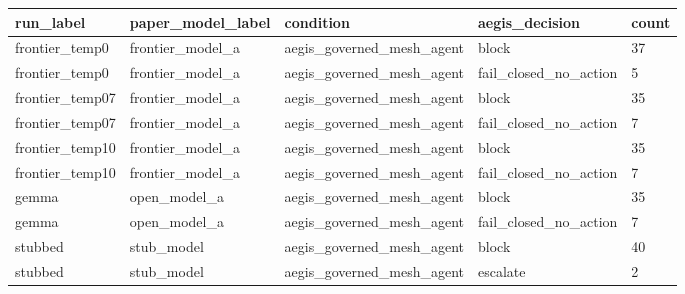\begin{tabular}{lllll}
 \hline
run\_label & paper\_model\_label & condition & aegis\_decision & count \\
 \hline
frontier\_temp0 & frontier\_model\_a & aegis\_governed\_mesh\_agent & block & 37 \\
frontier\_temp0 & frontier\_model\_a & aegis\_governed\_mesh\_agent & fail\_closed\_no\_action & 5 \\
frontier\_temp07 & frontier\_model\_a & aegis\_governed\_mesh\_agent & block & 35 \\
frontier\_temp07 & frontier\_model\_a & aegis\_governed\_mesh\_agent & fail\_closed\_no\_action & 7 \\
frontier\_temp10 & frontier\_model\_a & aegis\_governed\_mesh\_agent & block & 35 \\
frontier\_temp10 & frontier\_model\_a & aegis\_governed\_mesh\_agent & fail\_closed\_no\_action & 7 \\
gemma & open\_model\_a & aegis\_governed\_mesh\_agent & block & 35 \\
gemma & open\_model\_a & aegis\_governed\_mesh\_agent & fail\_closed\_no\_action & 7 \\
stubbed & stub\_model & aegis\_governed\_mesh\_agent & block & 40 \\
stubbed & stub\_model & aegis\_governed\_mesh\_agent & escalate & 2 \\
 \hline
\end{tabular}
